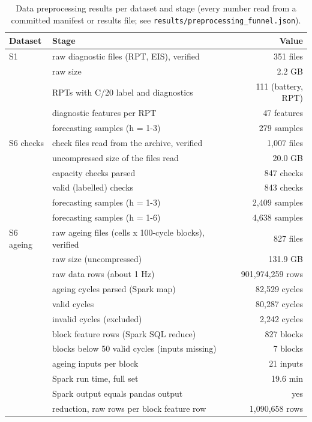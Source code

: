 \begin{table}[t]
  \centering
  \caption{Data preprocessing results per dataset and stage (every number read from a committed manifest or results file; see \texttt{results/preprocessing\_funnel.json}).}
  \label{tab:preprocessing}
  \scriptsize
  \setlength{\tabcolsep}{3pt}
  \begin{tabular}{llr}
    \toprule
    Dataset & Stage & Value \\
    \midrule
    S1 & raw diagnostic files (RPT, EIS), verified & 351 files \\
     & raw size & 2.2 GB \\
     & RPTs with C/20 label and diagnostics & 111 (battery, RPT) \\
     & diagnostic features per RPT & 47 features \\
     & forecasting samples (h = 1-3) & 279 samples \\
    S6 checks & check files read from the archive, verified & 1,007 files \\
     & uncompressed size of the files read & 20.0 GB \\
     & capacity checks parsed & 847 checks \\
     & valid (labelled) checks & 843 checks \\
     & forecasting samples (h = 1-3) & 2,409 samples \\
     & forecasting samples (h = 1-6) & 4,638 samples \\
    S6 ageing & raw ageing files (cells x 100-cycle blocks), verified & 827 files \\
     & raw size (uncompressed) & 131.9 GB \\
     & raw data rows (about 1 Hz) & 901,974,259 rows \\
     & ageing cycles parsed (Spark map) & 82,529 cycles \\
     & valid cycles & 80,287 cycles \\
     & invalid cycles (excluded) & 2,242 cycles \\
     & block feature rows (Spark SQL reduce) & 827 blocks \\
     & blocks below 50 valid cycles (inputs missing) & 7 blocks \\
     & ageing inputs per block & 21 inputs \\
     & Spark run time, full set & 19.6 min \\
     & Spark output equals pandas output & yes \\
     & reduction, raw rows per block feature row & 1,090,658 rows \\

\end{tabular}
\end{table}
